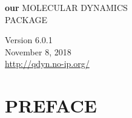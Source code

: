 \documentclass[a4paper,10pt]{article}
\newcommand{\dirfig}{./pictures}
\begin{document}
\setcaptionmargin{0.5cm} %
\thispagestyle{empty}
\begin{figure}[h]
\begin{center}
\end{center}
\end{figure}
\begin{center}
\huge{\textbf{our}} 
{\fontsize{46}{46}\selectfont M}{\fontsize{30}{30}\selectfont OLECULAR}
{\fontsize{46}{46}\selectfont D}{\fontsize{30}{30}\selectfont YNAMICS}\\
\vspace{0.2cm}
{\fontsize{30}{30}\selectfont PACKAGE}




\vspace{8.0cm}
\Huge{Version 6.0.1}\\
\Huge{November 8, 2018}\\
\vspace{0.8cm}
\large{\url{http://qdyn.no-ip.org/}}
\end{center}



\newpage
\tableofcontents
\newpage



\section{PREFACE}
\end{document}
